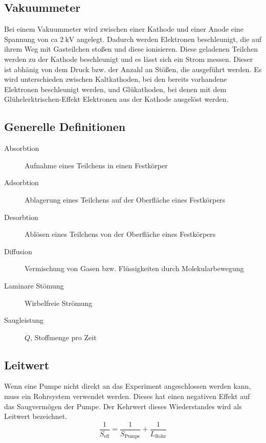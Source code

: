 \subsection{Vakuummeter}
Bei einem Vakuummeter wird zwischen einer Kathode und einer Anode eine Spannung von ca $\SI{2}{\kilo \volt}$ angelegt. Dadurch werden Elektronen
beschleunigt, die auf ihrem Weg mit Gasteilchen stoßen und diese ionisieren. Diese geladenen Teilchen werden zu der Kathode beschleunigt und es lässt sich ein
Strom messen. Dieser ist abhänig von dem Druck bzw. der Anzahl an Stößen, die ausgeführt werden. Es wird unterschieden zwischen Kaltkathoden, bei den bereits
vorhandene Elektronen beschleunigt werden, und Glükathoden, bei denen mit dem Glühelerktrischen-Effekt Elektronen aus der Kathode ausgelöst werden.
\subsection{Generelle Definitionen}
\begin{description}
	\item[Absorbtion] Aufnahme eines Teilchens in einen Festkörper
	\item[Adsorbtion] Ablagerung eines Teilchens auf der Oberfläche eines Festkörpers
	\item[Desorbtion] Ablösen eines Teilchens von der Oberfläche eines Festkörpers
	\item[Diffusion] Vermischung von Gasen bzw. Flüssigkeiten durch Molekularbewegung
	\item[Laminare Stömung] Wirbelfreie Strömung
	\item[Saugleistung] $\dot{Q}$, Stoffmenge pro Zeit

\end{description}
\subsection{Leitwert}
Wenn eine Pumpe nicht direkt an das Experiment angeschlossen werden kann, muss ein Rohrsystem verwendet werden. Dieses hat einen negativen Effekt auf das Saugvermögen der Pumpe. Der Kehrwert dieses Wiederstandes wird als Leitwert bezeichnet.
\begin{equation}
	\frac{1}{S_\text{eff}}=\frac{1}{S_\text{Pumpe}}+\frac{1}{L_\text{Rohr}}
\end{equation}
